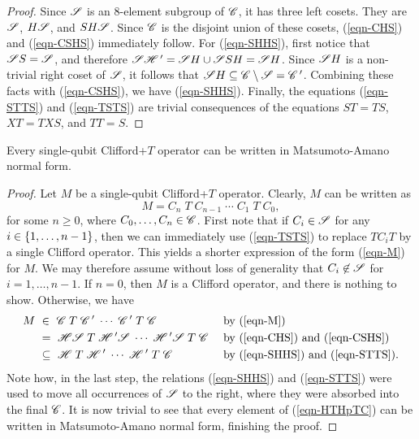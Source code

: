 \begin{proof}
  Since $\mathscr{S}$ is an 8-element subgroup of $\mathscr{C}$, it has three left cosets. They are $\mathscr{S}$, $H\mathscr{S}$,
  and $SH\mathscr{S}$. Since $\mathscr{C}$ is the disjoint union of these cosets, (\vref{eqn-CHS}) and
  (\vref{eqn-CSHS}) immediately follow. For (\vref{eqn-SHHS}), first notice that $\mathscr{S} S=\mathscr{S}$, and
  therefore $\mathscr{S}\mathscr{H}\,' = \mathscr{S} H\cup \mathscr{S} SH = \mathscr{S} H$. Since $\mathscr{S} H$ is a non-trivial right coset of
  $\mathscr{S}$, it follows that $\mathscr{S} H \subseteq \mathscr{C}\setminus\mathscr{S} = \mathscr{C}\,'$. Combining these facts with
  (\vref{eqn-CSHS}), we have (\vref{eqn-SHHS}). Finally, the equations (\vref{eqn-STTS}) and
  (\vref{eqn-TSTS}) are trivial consequences of the equations $ST=TS$, $XT=TXS$, and $TT=S$.
\end{proof}

\begin{proposition}\label{prop-ma}
  Every single-qubit Clifford+$T$ operator can be written in Matsumoto-Amano normal form.
\end{proposition}

\begin{proof}
  Let $M$ be a single-qubit Clifford+$T$ operator. Clearly, $M$ can be written as
  \begin{equation}\label{eqn-M}
    M = C_n\;T\;C_{n-1}\;\cdots\;C_1\;T\;C_0,
  \end{equation}
  for some $n\geq 0$, where $C_0,\ldots,C_n\in\mathscr{C}$. First note that if $C_i\in\mathscr{S}$ for any
  $i\in\{1,\ldots,n-1\}$, then we can immediately use (\vref{eqn-TSTS}) to replace $TC_iT$ by a
  single Clifford operator. This yields a shorter expression of the form (\vref{eqn-M}) for $M$. We
  may therefore assume without loss of generality that $C_i\not\in\mathscr{S}$ for $i=1,\ldots,n-1$. If
  $n=0$, then $M$ is a Clifford operator, and there is nothing to show. Otherwise, we have
  \begin{align}
    M ~&\in~ \mathscr{C}\;T\;\mathscr{C}\,'\;\cdots\;\mathscr{C}\,'\;T\;\mathscr{C} &&\mbox{ by (\ref{eqn-M})}\\
    &=~ \mathscr{H}\mathscr{S}\;T\;\mathscr{H}\,'\mathscr{S}\;\cdots\;\mathscr{H}\,'\mathscr{S}\;T\;\mathscr{C} &&\mbox{ by
      (\ref{eqn-CHS}) and (\ref{eqn-CSHS})}\\
    &\subseteq~ \mathscr{H}\;T\;\mathscr{H}\,'\;\cdots\;\mathscr{H}\,'\;T\;\mathscr{C} &&\mbox{ by
      (\ref{eqn-SHHS}) and (\ref{eqn-STTS}).}\label{eqn-HTHpTC}
  \end{align}
  Note how, in the last step, the relations (\vref{eqn-SHHS}) and (\vref{eqn-STTS}) were used to move
  all occurrences of $\mathscr{S}$ to the right, where they were absorbed into the final $\mathscr{C}$. It is now
  trivial to see that every element of (\vref{eqn-HTHpTC}) can be written in Matsumoto-Amano normal
  form, finishing the proof.
\end{proof}

